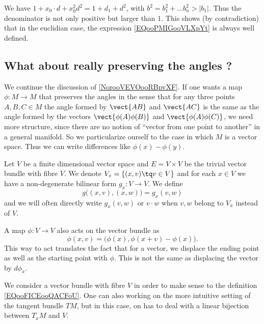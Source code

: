 We have \( 1+x_0\cdot d+x_0^2d^2=1+d_1+d^2\), with \( b^2=b_1^2+\ldots b_n^2>|b_1|\). Thus the denominator is not only positive but larger than \( 1\). This shows (by contradiction) that in the euclidian case, the expression \eqref{EQooPMIGooVLXpYt} is always well defined.

\subsection{What about really preserving the angles ?}
\label{sebsecooCBKEooQOWqFo}

We continue the discussion of \ref{NorooVEVOooRBpvXF}. If one wants a map \( \phi\colon M\to M\) that preserves the angles in the sense that for any three points \( A,B,C\in M\) the angle formed by \( \vect{ AB }\) and \( \vect{ AC }\) is the same as the angle formed by the vectors \( \vect{ \phi(A)\phi(B) }\) and \( \vect{ \phi(A)\phi(C) }\), we need more structure, since there are no notion of ``vector from one point to another'' in a general manifold. So we particularize ourself to the case in which \( M\) is a vector space. Thus we can write differences like \( \phi(x)-\phi(y)\).

Let \( V\) be a finite dimensional vector space and \( E=V\times V\) be the trivial vector bundle with fibre \( V\). We denote \( V_x=\{ (x,v)\tq v\in V \}\) and for each \( x\in V\) we have a non-degenerate bilinear form \( g_x\colon V\to V\). We define
\begin{equation}
    g\big( (x,v),(x,w) \big)=g_x(v,w)
\end{equation}
and we will often directly write \( g_x(v,w)\) or \( v\cdot w\) when \( v,w\) belong to \(V_x\) instead of \( V\).

A map \( \phi\colon V\to V\) also acts on the vector bundle as
\begin{equation}        \label{EQooFICEooQACFoU}
    \phi(x,v)=\big( \phi(x),\phi(x+v)-\phi(x) \big).
\end{equation}
This way to act translates the fact that for a vector, we displace the ending point as well as the starting point with \( \phi\). This is not the same as displacing the vector by \( d\phi_x\).

\begin{remark}
    We consider a vector bundle with fibre \( V\) in order to make sense to the definition \eqref{EQooFICEooQACFoU}. One can also working on the more intuitive setting of the tangent bundle \( TM\), but in this case, on has to deal with a linear bijection between \( T_xM\) and \( V\).
\end{remark}

